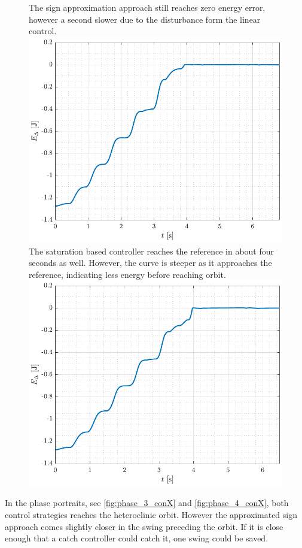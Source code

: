 \begin{figure}[H]
  \hspace{-10pt}
  \captionbox
  {
    The sign approximation approach still reaches zero energy error, however a second slower due to the disturbance form the linear control.
    \label{fig:Edelta_3_conX}
  }
  {
    \hspace{-1cm}
    \includegraphics[width=.46\textwidth]{figures/Edelta_3_conX}
  }
  \hspace{20pt}
  \captionbox 
  {
    The saturation based controller reaches the reference in about four seconds as well. However, the curve is steeper as it approaches the reference, indicating less energy before reaching orbit.
    \label{fig:Edelta_4_conX}
  }
  {
    \hspace{-1cm}
    \includegraphics[width=.46\textwidth]{figures/Edelta_4_conX}
  }  
\end{figure}
%
In the phase portraits, see \autoref{fig:phase_3_conX} and \ref{fig:phase_4_conX}, both control strategies reaches the heteroclinic orbit. However the approximated sign approach comes slightly closer in the swing preceding the orbit. If it is close enough that a catch controller could catch it, one swing could be saved.
